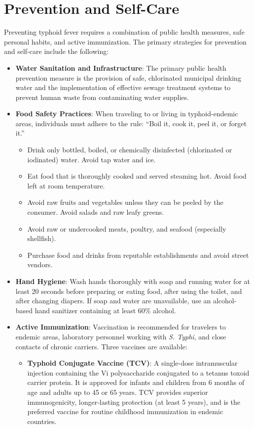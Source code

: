 \section*{Prevention and Self-Care}
Preventing typhoid fever requires a combination of public health measures, safe personal habits, and active immunization. The primary strategies for prevention and self-care include the following:
\begin{itemize}
  \item \textbf{Water Sanitation and Infrastructure}: The primary public health prevention measure is the provision of safe, chlorinated municipal drinking water and the implementation of effective sewage treatment systems to prevent human waste from contaminating water supplies.
  \item \textbf{Food Safety Practices}: When traveling to or living in typhoid-endemic areas, individuals must adhere to the rule: ``Boil it, cook it, peel it, or forget it.''
  \begin{itemize}
    \item Drink only bottled, boiled, or chemically disinfected (chlorinated or iodinated) water. Avoid tap water and ice.
    \item Eat food that is thoroughly cooked and served steaming hot. Avoid food left at room temperature.
    \item Avoid raw fruits and vegetables unless they can be peeled by the consumer. Avoid salads and raw leafy greens.
    \item Avoid raw or undercooked meats, poultry, and seafood (especially shellfish).
    \item Purchase food and drinks from reputable establishments and avoid street vendors.
  \end{itemize}
  \item \textbf{Hand Hygiene}: Wash hands thoroughly with soap and running water for at least 20 seconds before preparing or eating food, after using the toilet, and after changing diapers. If soap and water are unavailable, use an alcohol-based hand sanitizer containing at least 60\% alcohol.
  \item \textbf{Active Immunization}: Vaccination is recommended for travelers to endemic areas, laboratory personnel working with \textit{S. Typhi}, and close contacts of chronic carriers. Three vaccines are available:
  \begin{itemize}
    \item \textbf{Typhoid Conjugate Vaccine (TCV)}: A single-dose intramuscular injection containing the Vi polysaccharide conjugated to a tetanus toxoid carrier protein. It is approved for infants and children from 6 months of age and adults up to 45 or 65 years. TCV provides superior immunogenicity, longer-lasting protection (at least 5 years), and is the preferred vaccine for routine childhood immunization in endemic countries.

\end{itemize}
\end{itemize}
